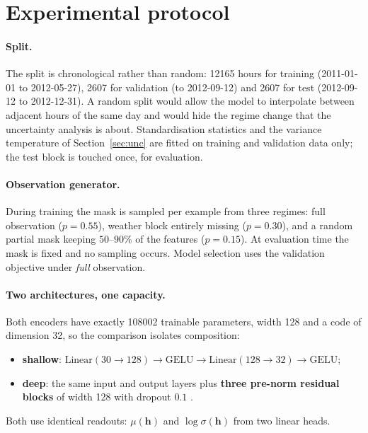 \documentclass[11pt,a4paper]{article}
\newcommand{\hvec}{\mathbf{h}}
\begin{document}
\section{Experimental protocol}

\paragraph{Split.}
The split is chronological rather than random: \num{12165} hours for training (2011-01-01 to
2012-05-27), \num{2607} for validation (to 2012-09-12) and \num{2607} for test (2012-09-12 to
2012-12-31). A random split would allow the model to interpolate between adjacent hours of the same
day and would hide the regime change that the uncertainty analysis is about. Standardisation
statistics and the variance temperature of Section~\ref{sec:unc} are fitted on training and
validation data only; the test block is touched once, for evaluation.

\paragraph{Observation generator.}
During training the mask is sampled per example from three regimes: full observation
($p=0.55$), weather block entirely missing ($p=0.30$), and a random partial mask keeping
$50$--$90\%$ of the features ($p=0.15$). At evaluation time the mask is fixed and no sampling
occurs. Model selection uses the validation objective under \emph{full} observation.

\paragraph{Two architectures, one capacity.}
Both encoders have exactly \num{108002} trainable parameters, width 128 and a code of dimension 32, so
the comparison isolates composition:
\begin{itemize}
  \item \textbf{shallow}: $\mathrm{Linear}(30\!\to\!128)\to\mathrm{GELU}\to\mathrm{Linear}(128\!\to\!32)\to\mathrm{GELU}$;
  \item \textbf{deep}: the same input and output layers plus \textbf{three pre-norm residual blocks}
        of width 128 with dropout $0.1$ \cite{he2016}.
\end{itemize}
Both use identical readouts: $\mu(\hvec)$ and $\log\sigma(\hvec)$ from two linear heads.
\end{document}
